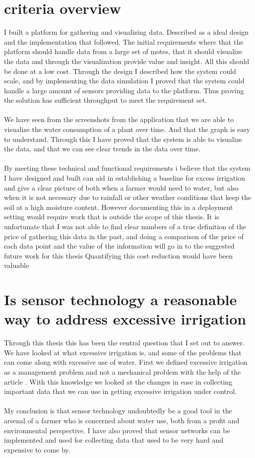 \documentclass[]{uiophd}
\begin{document}
\section{criteria overview}
I built a platform for gathering and visualizing data. Described as a ideal design and the implementation that followed. The initial requirements where that the platform should handle data from a large set of motes, that it should visualize the data and through the visualization provide value and insight. All this should be done at a low cost. Through the design I described how the system could scale, and by implementing the data simulation I proved that the system could handle a large amount of sensors providing data to the platform. Thus proving the solution has sufficient throughput to meet the requirement set.
\\\\
We have seen from the screenshots from the application that we are able to visualize the water consumption of a plant over time. And that the graph is easy to understand. Through this I have proved that the system is able to visualize the data, and that we can see clear trends in the data over time.
\\\\
By meeting these technical and functional requirements i believe that the system I have designed and built can aid in establishing a baseline for excess irrigation and give a clear picture of both when a farmer would need to water, but also when it is not necessary due to rainfall or other weather conditions that keep the soil at a high moisture content. However documenting this in a deployment setting would require work that is outside the scope of this thesis. It is unfortunate that I was not able to find clear numbers of a true definition of the price of gathering this data in the past, and doing a comparison of the price of each data point and the value of the information will go in to the suggested future work for this thesis Quantifying this cost reduction would have been valuable


\section{ Is sensor technology a reasonable way to address excessive irrigation}

Through this thesis this has been the central question that I set out to answer. We have looked at what excessive irrigation is, and some of the problems that can come along with excessive use of water. First we defined excessive irrigation as a management problem and not a mechanical problem with the help of the article \parencite{LILIENFELD200773}. With this knowledge we looked at the changes in ease in collecting important data that we can use in getting excessive irrigation under control. 
\\\\
My conclusion is that sensor technology undoubtedly be a good tool in the arsenal of a farmer who is concerned about water use, both from a profit and environmental perspective. I have also proved that sensor networks can be implemented and used for collecting data that used to be very hard and expensive to come by.
\end{document}
